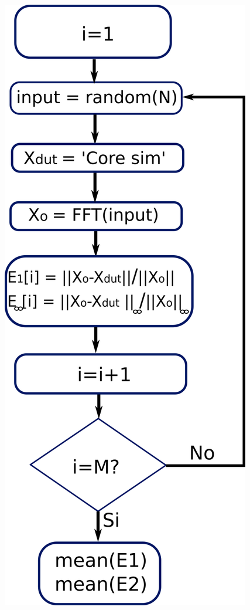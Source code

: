 \begin{frame}{}
    \begin{columns}[T]
      \begin{column}{.44\textwidth}
        \begin{center}
          \advance\leftskip-0.2cm
          \includegraphics[scale=0.3]{./figures/error_sim.png}
        \end{center}
      \end{column}
      

\end{columns}
\end{frame}
